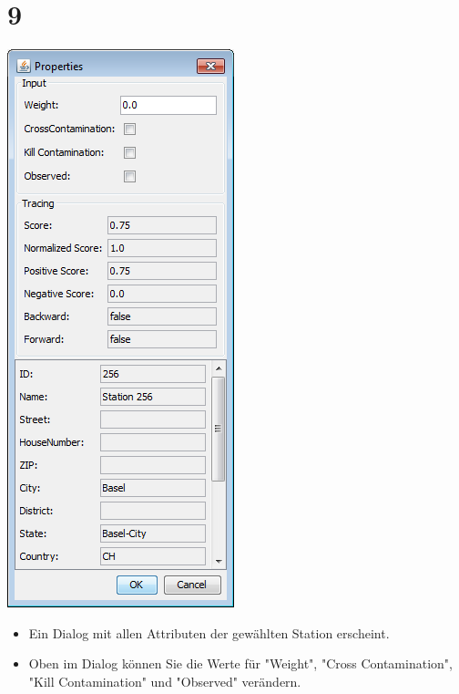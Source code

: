 \documentclass{beamer}
\begin{document}
\section{9}
\begin{frame}
	\begin{center}
  		\includegraphics[height=0.6\textheight]{9.png}
	\end{center}
	\begin{itemize}
		\item Ein Dialog mit allen Attributen der gewählten Station erscheint.
		\item Oben im Dialog können Sie die Werte für "Weight", "Cross Contamination", "Kill Contamination" und "Observed" verändern.		
	\end{itemize}
\end{frame}
\end{document}
